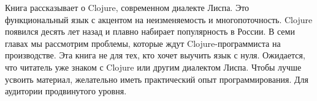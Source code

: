 \thispagestyle{empty}

\small

Книга рассказывает о Clojure, современном диалекте Лиспа. Это функциональный
язык с акцентом на неизменяемость и многопоточность. Clojure появился десять лет
назад и плавно набирает популярность в России. В семи главах мы рассмотрим
проблемы, которые ждут Clojure-программиста на производстве. Эта книга не для
тех, кто хочет выучить язык с нуля. Ожидается, что читатель уже знаком с Clojure
или другим диалектом Лиспа. Чтобы лучше усвоить материал, желательно иметь
практический опыт программирования. Для аудитории продвинутого уровня.
